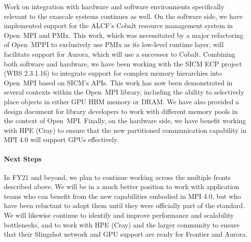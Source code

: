 Work on integration with hardware and software environments specifically relevant to the exascale systems continues as well.  On the software
side, we have implemented support for the ALCF's Cobalt resource management system in Open~MPI and PMIx.  This work, which was necessitated by
a major refactoring of Open~MPPI to exclusively use PMIx as its low-level runtime layer, will facilitate support for Aurora, 
which will use a successor to Cobalt.  Combining both software and hardware, we have been working with the SICM ECP project
(WBS 2.3.1.16) to integrate support for complex memory hierarchies into Open~MPI based on SICM's APIs.  This work has now
been demonstrated in several contexts within the Open~MPI library, including the ability to selectively place objects in
either GPU HBM memory or DRAM.  We have also provided a design document for library developers
to work with different memory pools in the context of Open~MPI.  Finally, on the hardware side, we have benefit
working with HPE (Cray) to ensure that the new partitioned communication capability in MPI 4.0 will support GPUs effectively.

\paragraph{Next Steps}
In FY21 and beyond, we plan to continue working across the multiple fronts described above.  We will be in a much better position to work with application teams who can benefit from the new capabilities embodied in MPI 4.0, but who have been reluctant to adopt them until they were officially part of the standard.  We will likewise continue to identify and improve performance and scalability bottlenecks, and to work with HPE (Cray) and the larger community to ensure that their Slingshot network and GPU support are ready for Frontier and Aurora.
